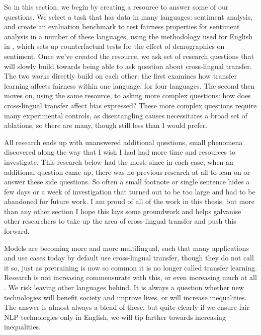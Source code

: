 So in this section, we begin by creating a resource to answer some of our questions. We select a task that has data in many languages: sentiment analysis, and create an evaluation benchmark to test fairness properties for sentiment analysis in a number of these languages, using the methodology used for English in \citet{kiritchenko-mohammad-2018-examining}, which sets up counterfactual tests for the effect of demographics on sentiment.  Once we've created the resource, we ask set of research questions that will slowly build towards being able to ask question about cross-lingual transfer. The two works directly build on each other: the first examines how transfer learning affects fairness within one language, for four languages. The second then moves on, using the same resource, to asking more complex questions: how does cross-lingual transfer affect bias expressed? These more complex questions require many experimental controls, as disentangling causes necessitates a broad set of ablations, so there are many, though still less than I would prefer.

All research ends up with unanswered additional questions, small phenomena discovered along the way that I wish I had had more time and resources to investigate. This research below had the most: since in each case, when an additional question came up, there was no previous research at all to lean on or answer these side questions. So often a small footnote or single sentence hides a few days or a week of investigation that turned out to be too large and had to be abandoned for future work. I am proud of all of the work in this thesis, but more than any other section I hope this lays some groundwork and helps galvanise other researchers to take up the area of cross-lingual transfer and push this forward. 

Models are becoming more and more multilingual, such that many applications and use cases today by default use cross-lingual transfer, though they do not call it so, just as pretraining is now so common it is no longer called transfer learning. Research is not increasing commensurate with this, or even increasing much at all \citep{ruder-etal-2022-square, blasi-etal-2022-systematic}. We risk leaving other languages behind. It is always a question whether new technologies will benefit society and improve lives, or will increase inequalities. The answer is almost always a blend of these, but quite clearly if we ensure fair NLP technologies only in English, we will tip farther towards increasing inequalities. 
